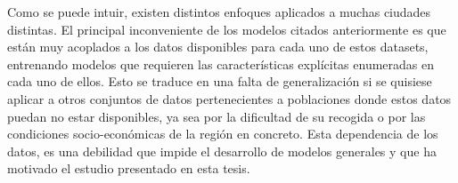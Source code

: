 \documentclass{uathesis-es}
\begin{document}
Como se puede intuir, existen distintos enfoques aplicados a muchas ciudades distintas. El principal inconveniente de los modelos citados anteriormente es que están muy acoplados a los datos disponibles para cada uno de estos datasets, entrenando modelos que requieren las características explícitas enumeradas en cada uno de ellos. Esto se traduce en una falta de generalización si se quisiese aplicar a otros conjuntos de datos pertenecientes a poblaciones donde estos datos puedan no estar disponibles, ya sea por la dificultad de su recogida o por las condiciones socio-económicas de la región en concreto. Esta dependencia de los datos, es una debilidad que impide el desarrollo de modelos generales y que ha motivado el estudio presentado en esta tesis.













\end{document}
